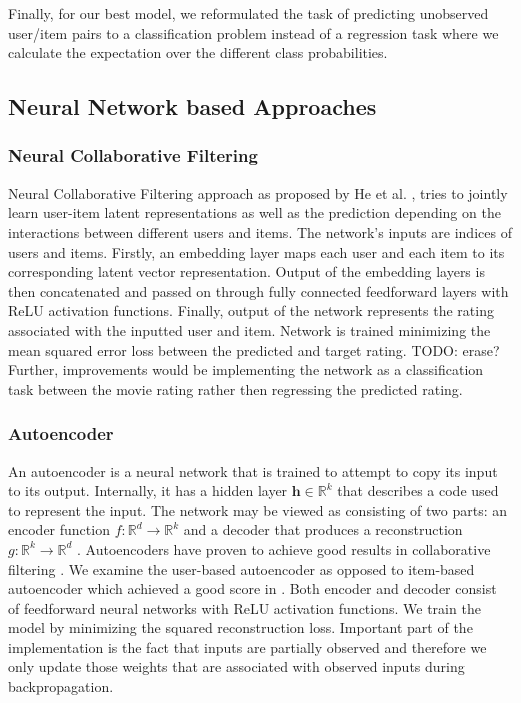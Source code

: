 \documentclass[10pt,conference,compsocconf]{IEEEtran}
\begin{document}
    Finally, for our best model, we reformulated the task of predicting unobserved user/item pairs to a classification problem instead of a regression task where we calculate the expectation over the different class probabilities.

    \subsection{Neural Network based Approaches}

    \subsubsection{Neural Collaborative Filtering}
    Neural Collaborative Filtering approach as proposed by He et al. \cite{DBLP:journals/corr/abs-1708-05031}, tries to
    jointly learn user-item latent representations as well as the prediction depending on the interactions between
    different users and items. The network's inputs are indices of users and items. Firstly, an embedding layer maps
    each user and each item to its corresponding latent vector representation. Output of the embedding layers is then
    concatenated and passed on through fully connected feedforward layers with ReLU activation functions. Finally,
    output of the network represents the rating associated with the inputted user and item. Network is trained minimizing
    the mean squared error loss between the predicted and target rating. TODO: erase? Further, improvements would be
    implementing the network as a classification task between the movie rating rather then regressing the predicted rating.

    \subsubsection{Autoencoder}
    An autoencoder is a neural network that is trained to attempt to copy its input to its output.
    Internally, it has a hidden layer $\textbf{h} \in \mathbb{R}^k$ that describes a code used to represent the input.
    The network may be viewed as consisting of two parts: an encoder function $f: \mathbb{R} ^d \rightarrow \mathbb{R} ^k$ and a
    decoder that produces a reconstruction $g: \mathbb{R} ^k \rightarrow \mathbb{R} ^d$ \cite{Goodfellow-et-al-2016}.
    Autoencoders have proven to achieve good results in collaborative filtering \cite{inproceedings}.
    We examine the user-based autoencoder as opposed to item-based autoencoder which achieved a good score in \cite{inproceedings}.
    Both encoder and decoder consist of feedforward neural networks with ReLU activation functions.
    We train the model by minimizing the squared reconstruction loss.
    Important part of the implementation is the fact that inputs are partially observed and therefore we only update those weights that are associated with observed inputs during backpropagation.
\end{document}
